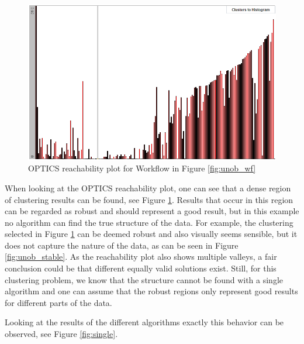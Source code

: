 \documentclass[
	a4paper,
	english,
	twoside,
	openright,               
	11pt                            
	]{report}
\begin{document}
\begin{figure}[H]
	\centering
	\includegraphics[scale=.6]{unob_optics_stable}
	\caption{OPTICS reachability plot for Workflow in Figure \ref{fig:unob_wf}}
	\label{fig:unob_optics_stable}
\end{figure}

When looking at the OPTICS reachability plot, one can see that a dense region of clustering results can be found, see Figure \ref{fig:unob_optics_stable}. Results that occur in this region can be regarded as robust and should represent a good result, but in this example no algorithm can find the true structure of the data. For example, the clustering selected in Figure \ref{fig:unob_optics_stable} can be deemed robust and also visually seems sensible, but it does not capture the nature of the data, as can be seen in Figure \ref{fig:unob_stable}. As the reachability plot also shows multiple valleys, a fair conclusion could be that different equally valid solutions exist. Still, for this clustering problem, we know that the structure cannot be found with a single algorithm and one can assume that the robust regions only represent good results for different parts of the data. 

Looking at the results of the different algorithms exactly this behavior can be observed, see Figure \ref{fig:single}.
\end{document}
